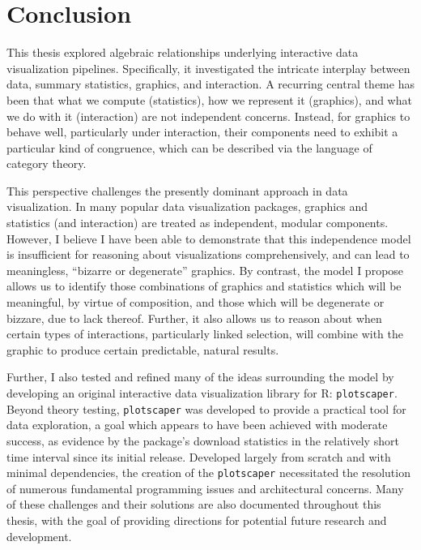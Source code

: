 \documentclass[
  openany]{book}
\theoremstyle{definition}
\theoremstyle{definition}
\theoremstyle{definition}
\theoremstyle{definition}
\theoremstyle{remark}
\begin{document}
\chapter{Conclusion}\label{conclusion}

This thesis explored algebraic relationships underlying interactive data visualization pipelines. Specifically, it investigated the intricate interplay between data, summary statistics, graphics, and interaction. A recurring central theme has been that what we compute (statistics), how we represent it (graphics), and what we do with it (interaction) are not independent concerns. Instead, for graphics to behave well, particularly under interaction, their components need to exhibit a particular kind of congruence, which can be described via the language of category theory.

This perspective challenges the presently dominant approach in data visualization. In many popular data visualization packages, graphics and statistics (and interaction) are treated as independent, modular components. However, I believe I have been able to demonstrate that this independence model is insufficient for reasoning about visualizations comprehensively, and can lead to meaningless, ``bizarre or degenerate'' graphics. By contrast, the model I propose allows us to identify those combinations of graphics and statistics which will be meaningful, by virtue of composition, and those which will be degenerate or bizzare, due to lack thereof. Further, it also allows us to reason about when certain types of interactions, particularly linked selection, will combine with the graphic to produce certain predictable, natural results.

Further, I also tested and refined many of the ideas surrounding the model by developing an original interactive data visualization library for R: \texttt{plotscaper}. Beyond theory testing, \texttt{plotscaper} was developed to provide a practical tool for data exploration, a goal which appears to have been achieved with moderate success, as evidence by the package's download statistics in the relatively short time interval since its initial release. Developed largely from scratch and with minimal dependencies, the creation of the \texttt{plotscaper} necessitated the resolution of numerous fundamental programming issues and architectural concerns. Many of these challenges and their solutions are also documented throughout this thesis, with the goal of providing directions for potential future research and development.
\end{document}
